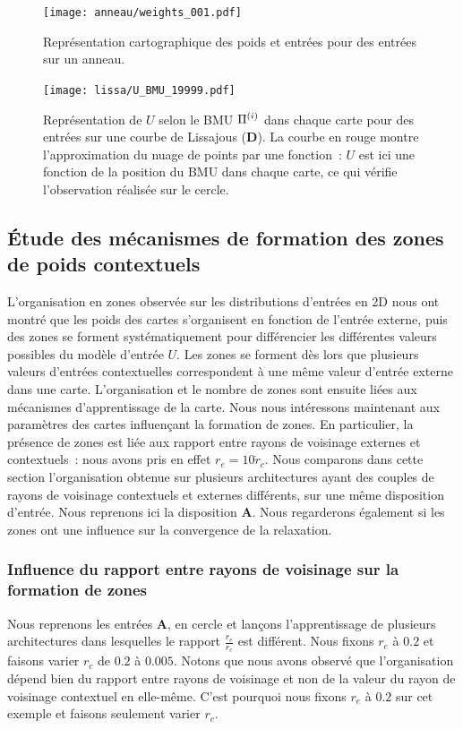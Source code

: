 \documentclass[../main]{subfiles}
\begin{document}
\begin{figure}
	\centering\texttt{[image: anneau/weights\_001.pdf]}
	\caption{Représentation cartographique des poids et entrées pour des entrées sur un anneau. \label{fig:anneau_w}}
\end{figure}

\begin{figure}
	\centering\texttt{[image: lissa/U\_BMU\_19999.pdf]}
	\caption{Représentation de $U$ selon le BMU $\Pi^{({i})}$ dans chaque carte pour des entrées sur une courbe de Lissajous (\textbf{D}). La courbe en rouge montre l'approximation du nuage de points par une fonction~: $U$ est ici une fonction de la position du BMU dans chaque carte, ce qui vérifie l'observation réalisée sur le cercle.}
\end{figure}

\subsection{\'Etude des mécanismes de formation des zones de poids contextuels}

L'organisation en zones observée sur les distributions d'entrées en 2D nous ont montré que les poids des cartes s'organisent en fonction de l'entrée externe, puis des zones se forment systématiquement pour différencier les différentes valeurs possibles du modèle d'entrée $U$. Les zones se forment dès lors que plusieurs valeurs d'entrées contextuelles correspondent à une même valeur d'entrée externe dans une carte.
L'organisation et le nombre de zones sont ensuite liées aux mécanismes d'apprentissage de la carte.
Nous nous intéressons maintenant aux paramètres des cartes influençant la formation de zones.
En particulier, la présence de zones est liée aux rapport entre rayons de voisinage externes et contextuels~: nous avons pris en effet $r_e = 10\dot r_c$.
Nous comparons dans cette section l'organisation obtenue sur plusieurs architectures ayant des couples de rayons de voisinage contextuels et externes différents, sur une même disposition d'entrée. Nous reprenons ici la disposition \textbf{A}.
Nous regarderons également si les zones ont une influence sur la convergence de la relaxation.

\subsubsection{Influence du rapport entre rayons de voisinage sur la formation de zones}

Nous reprenons les entrées \textbf{A}, en cercle et lançons l'apprentissage de plusieurs architectures dans lesquelles le rapport $\frac{r_e}{r_c}$ est différent.
Nous fixons $r_e$ à $0.2$ et faisons varier $r_c$ de $0.2$ à $0.005$. 
Notons que nous avons observé que l'organisation dépend bien du rapport entre rayons de voisinage et non de la valeur du rayon de voisinage contextuel en elle-même. C'est pourquoi nous fixons $r_e$ à $0.2$ sur cet exemple et faisons seulement varier $r_c$.
\end{document}
